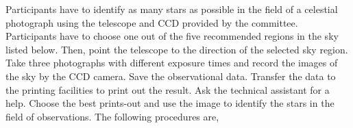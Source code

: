 Participants have to identify as many stars as possible in the field of a
celestial photograph using the telescope and CCD provided by the committee.
Participants have to choose one out of the five recommended regions in the
sky listed below. Then, point the telescope to the direction of the selected
sky region. Take three photographs with different exposure times and record
the images of the sky by the CCD camera. Save the observational data.
Transfer the data to the printing facilities to print out the result. Ask
the technical assistant for a help. Choose the best prints-out and use the
image to identify the stars in the field of observations. The following
procedures are,


